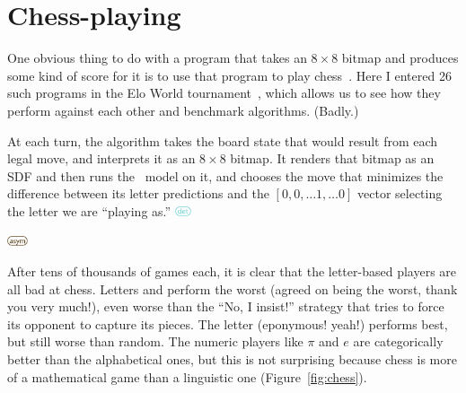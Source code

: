 \documentclass[twocolumn]{article}
\begin{document}


\section{Chess-playing}

\newcommand\deterministic{
  \includegraphics[height=0.8em]{deterministic}
}
\newcommand\asymmetric{
  \includegraphics[height=0.8em]{asymmetric}
}


One obvious thing to do with a program that takes an $8 \times 8$
bitmap and produces some kind of score for it is to use that
program to play chess~\cite{murphy2019blind}. Here I entered
26 such programs in the Elo World tournament~\cite{murphy2019eloworld},
which allows us to see how they perform against each other
and benchmark algorithms. (Badly.)

At each turn, the algorithm takes the board state that would
result from each legal move, and interprets it as an $8 \times 8$
bitmap. It renders that bitmap as an SDF and then runs the
\makelowercase\ model on it, and chooses the move that minimizes
the difference between its letter predictions and the
$[0, 0, \ldots 1, \ldots 0]$ vector selecting the letter
we are ``playing as.'' \deterministic \asymmetric

After tens of thousands of games each, it is clear that the
letter-based players are all bad at chess. Letters  and
 perform the worst (agreed on  being the
worst, thank you very much!), even worse than the ``No, I insist!''
strategy that tries to force its opponent to capture its pieces. The
letter  (eponymous! yeah!) performs best, but still
worse than random. The numeric players like $\pi$ and $e$ are
categorically better than the alphabetical ones, but this is not
surprising because chess is more of a mathematical game than a
linguistic one (Figure~\ref{fig:chess}).
\end{document}
